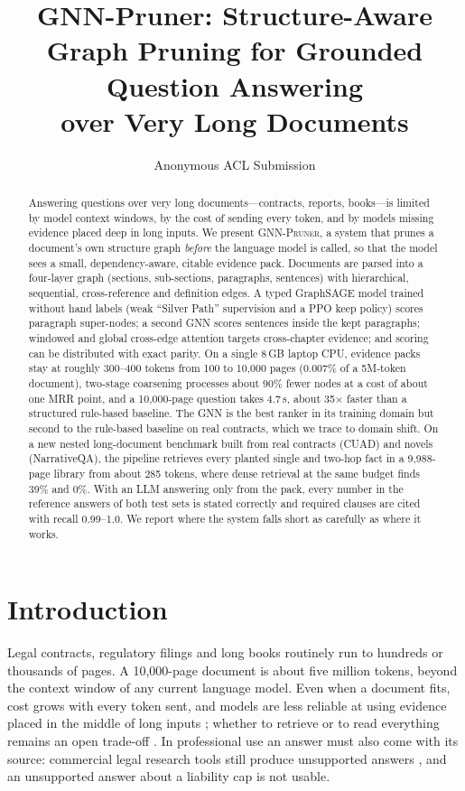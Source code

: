 \documentclass[11pt]{article}
\title{GNN-Pruner: Structure-Aware Graph Pruning for Grounded Question Answering\\ over Very Long Documents}
\author{Anonymous ACL Submission}
\newcommand{\system}{\textsc{GNN-Pruner}}
\begin{document}
\maketitle

\begin{abstract}
Answering questions over very long documents---contracts, reports, books---is limited by model context windows, by the cost of sending every token, and by models missing evidence placed deep in long inputs. We present \system{}, a system that prunes a document's own structure graph \emph{before} the language model is called, so that the model sees a small, dependency-aware, citable evidence pack. Documents are parsed into a four-layer graph (sections, sub-sections, paragraphs, sentences) with hierarchical, sequential, cross-reference and definition edges. A typed GraphSAGE model trained without hand labels (weak ``Silver Path'' supervision and a PPO keep policy) scores paragraph super-nodes; a second GNN scores sentences inside the kept paragraphs; windowed and global cross-edge attention targets cross-chapter evidence; and scoring can be distributed with exact parity. On a single 8\,GB laptop CPU, evidence packs stay at roughly 300--400 tokens from 100 to 10,000 pages (0.007\% of a 5M-token document), two-stage coarsening processes about 90\% fewer nodes at a cost of about one MRR point, and a 10,000-page question takes 4.7\,s, about 35$\times$ faster than a structured rule-based baseline. The GNN is the best ranker in its training domain but second to the rule-based baseline on real contracts, which we trace to domain shift. On a new nested long-document benchmark built from real contracts (CUAD) and novels (NarrativeQA), the pipeline retrieves every planted single and two-hop fact in a 9,988-page library from about 285 tokens, where dense retrieval at the same budget finds 39\% and 0\%. With an LLM answering only from the pack, every number in the reference answers of both test sets is stated correctly and required clauses are cited with recall 0.99--1.0. We report where the system falls short as carefully as where it works.
\end{abstract}

\section{Introduction}

Legal contracts, regulatory filings and long books routinely run to hundreds or thousands of pages. A 10,000-page document is about five million tokens, beyond the context window of any current language model. Even when a document fits, cost grows with every token sent, and models are less reliable at using evidence placed in the middle of long inputs \citep{liu2024lost,hsieh2024ruler}; whether to retrieve or to read everything remains an open trade-off \citep{xu2024retrievallong,li2024selfroute}. In professional use an answer must also come with its source: commercial legal research tools still produce unsupported answers \citep{magesh2024hallucination}, and an unsupported answer about a liability cap is not usable.
\end{document}
